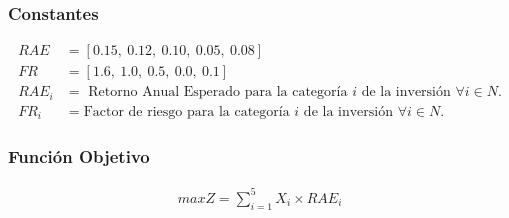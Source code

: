\documentclass[a4paper,12pt]{article}
\begin{document}
\subsubsection{Constantes}
\begin{equation*}
\begin{split}
	RAE &= [0.15,\ 0.12,\ 0.10,\ 0.05,\ 0.08] \\
	FR & = [1.6,\ 1.0,\ 0.5,\ 0.0,\ 0.1] \\
	RAE_i &= \text{ Retorno Anual Esperado para la categoría } i \text{ de la inversión } \forall i \in N. \\
	FR_i &= \text{Factor de riesgo para la categoría } i \text{ de la inversión } \forall i \in N.
\end{split}
\end{equation*}
\subsubsection{Función Objetivo}
\begin{equation*}
\begin{split}
	maxZ = \sum_{i = 1}^{5}X_i\times RAE_i
\end{split}
\end{equation*}
\end{document}
